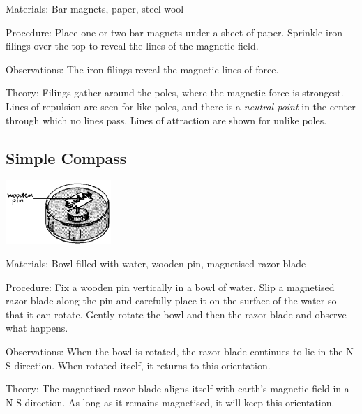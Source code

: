 \begin{multicols}{2}
\begin{description*}
\item[Materials:]{Bar magnets, paper, steel wool}
\item[Procedure:]{Place one or two bar magnets under a sheet of paper. Sprinkle iron filings over the top to reveal the lines of the magnetic field.}
\item[Observations:]{The iron filings reveal the magnetic lines of force.}
\item[Theory:]{Filings gather around the poles, where the magnetic force is strongest. Lines of repulsion are seen for like poles, and there is a \emph{neutral point} in the center through which no lines pass. Lines of attraction are shown for unlike poles.}
\end{description*}

\subsection{Simple Compass}

\begin{center}
\includegraphics[width=0.3\textwidth]{./img/source/compass.png}
\end{center}

\begin{description*}
\item[Materials:]{Bowl filled with water, wooden pin, magnetised razor blade}
\item[Procedure:]{Fix a wooden pin vertically in a bowl of water. Slip a magnetised razor blade along the pin and carefully place it on the surface of the water so that it can rotate. Gently rotate the bowl and then the razor blade and observe what happens.}
\item[Observations:]{When the bowl is rotated, the razor blade continues to lie in the N-S direction. When rotated itself, it returns to this orientation.}
\item[Theory:]{The magnetised razor blade aligns itself with earth's magnetic field in a N-S direction. As long as it remains magnetised, it will keep this orientation.}
\end{description*}


\end{multicols}
